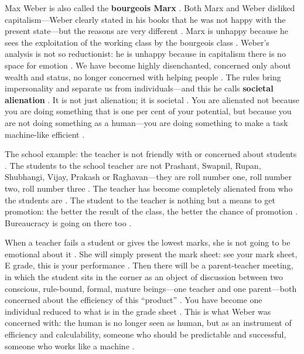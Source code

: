 \begin{KeyConcept}
Max Weber is also called the \textbf{bourgeois Marx} .
Both Marx and Weber disliked capitalism---Weber clearly stated in his books that he was not happy with the present state---but the reasons are very different .
Marx is unhappy because he sees the exploitation of the working class by the bourgeois class . Weber's analysis is not so reductionist: he is unhappy because in capitalism there is no space for emotion . We have become highly disenchanted, concerned only about wealth and status, no longer concerned with helping people . The rules bring impersonality and separate us from individuals---and this he calls \textbf{societal alienation} .
It is not just alienation; it is societal . You are alienated not because you are doing something that is one per cent of your potential, but because you are not doing something as a human---you are doing something to make a task machine-like efficient .
\end{KeyConcept}

\begin{ExampleBox}
The school example: the teacher is not friendly with or concerned about students . The students to the school teacher are not Prashant, Swapnil, Rupan, Shubhangi, Vijay, Prakash or Raghavan---they are roll number one, roll number two, roll number three .
The teacher has become completely alienated from who the students are . The student to the teacher is nothing but a means to get promotion: the better the result of the class, the better the chance of promotion . Bureaucracy is going on there too .

When a teacher fails a student or gives the lowest marks, she is not going to be emotional about it . She will simply present the mark sheet: see your mark sheet, E grade, this is your performance .
Then there will be a parent-teacher meeting, in which the student sits in the corner as an object of discussion between two conscious, rule-bound, formal, mature beings---one teacher and one parent---both concerned about the efficiency of this ``product'' .
You have become one individual reduced to what is in the grade sheet . This is what Weber was concerned with: the human is no longer seen as human, but as an instrument of efficiency and calculability, someone who should be predictable and successful, someone who works like a machine .
\end{ExampleBox}

